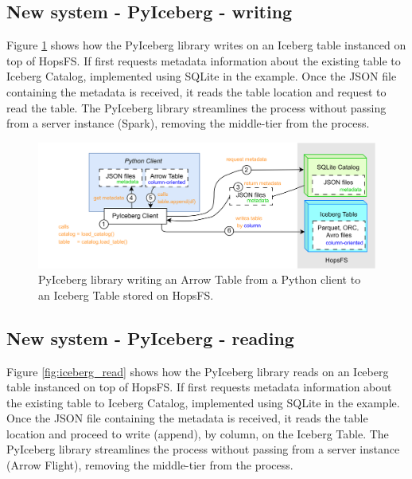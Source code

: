 \subsection{New system - PyIceberg - writing}
\label{subsec:back_sys_iceberg_write}

Figure \ref{fig:iceberg_write} shows how the PyIceberg library writes on an Iceberg table instanced on top of \gls{HopsFS}. If first requests metadata information about the existing table to Iceberg Catalog, implemented using SQLite in the example. Once the JSON file containing the metadata is received, it reads the table location and request to read the table. The PyIceberg library streamlines the process without passing from a server instance (Spark), removing the middle-tier from the process.

\begin{figure}
    \begin{center}
      \includegraphics[width=\textwidth]{figures/2-background_and_related_work/iceberg_write.png}
    \end{center}
    \caption[New system - PyIceberg - write process]{PyIceberg library writing an Arrow Table from a Python client to an Iceberg Table stored on \gls{HopsFS}.}
    \label{fig:iceberg_write}
\end{figure}



\subsection{New system - PyIceberg - reading}
\label{subsec:back_sys_iceberg_read}

Figure \ref{fig:iceberg_read} shows how the PyIceberg library reads on an Iceberg table instanced on top of \gls{HopsFS}. If first requests metadata information about the existing table to Iceberg Catalog, implemented using SQLite in the example. Once the JSON file containing the metadata is received, it reads the table location and proceed to write (append), by column, on the Iceberg Table. The PyIceberg library streamlines the process without passing from a server instance (Arrow Flight), removing the middle-tier from the process.

